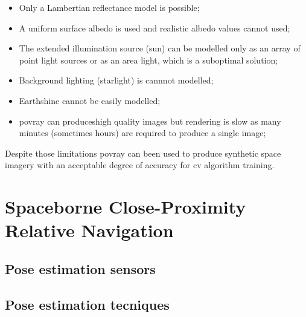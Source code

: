 \begin{itemize}
    \item Only a Lambertian reflectance model is possible;
    \item A uniform surface albedo is used and realistic albedo values cannot used;
    \item The extended illumination source (sun) can be modelled only as an array of point light sources or as an area light, which is a suboptimal solution;
    \item Background lighting (starlight) is cannnot modelled;
    \item Earthshine cannot be easily modelled;
    \item \acrshort{povray} can produceshigh quality images but rendering is slow as many minutes (sometimes hours) are required to produce a single image;
\end{itemize}
Despite those limitations \acrshort{povray} can been used to produce synthetic space imagery with an acceptable degree of accuracy for \acrshort{cv} algorithm training.\\

\section{Spaceborne Close-Proximity Relative Navigation}

\subsection{Pose estimation sensors}

\subsection{Pose estimation tecniques}



